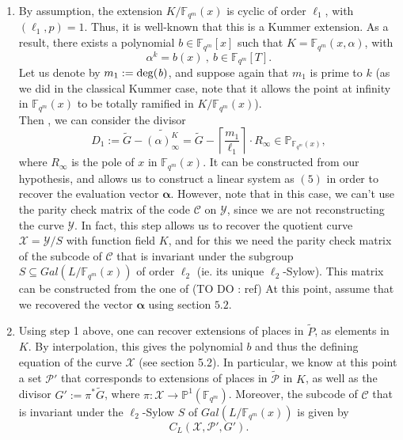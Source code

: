 \documentclass[10pt]{article}
\newcommand{\cd}{\cdot}
\newcommand{\fqm}{\mathbb{F}_{q^m}}
\newcommand{\su}{\subseteq}
\newcommand{\X}{\mathcal{X}}
\newcommand{\Y}{\mathcal{Y}}
\newcommand{\PR}{\mathcal{P}}
\begin{document}
\begin{enumerate}
\item By assumption, the extension $K/\fqm(x)$ is cyclic of order $\ell_1$, with $(\ell_1,p)=1$. Thus, it is well-known that this is a Kummer extension. As a result, there exists a polynomial $b \in \fqm[x]$ such that $K = \fqm(x,\alpha)$, with
\[ \alpha^k = b(x) \ , \ b \in \fqm[T].\] Let us denote by $m_1:=\rm{deg}\it (b)$, and suppose again that $m_1$ is prime to $k$ (as we did in the classical Kummer case, note that it allows the point at infinity in $\fqm(x)$ to be totally ramified in $K/\fqm(x)$). \\ Then , we can consider the divisor
\[D_1 := \tilde{G} - \widetilde{(\alpha)^K_{\infty}} = \tilde{G} - \left\lceil\frac{m_1}{\ell_1}\right\rceil \cd R_{\infty} \in \mathbb{P}_{\fqm(x)},\]
where $R_{\infty}$ is the pole of $x$ in $\fqm(x)$. It can be constructed from our hypothesis, and allows us to construct a linear system as $(5)$ in order to recover the evaluation vector $\boldsymbol{\alpha}$. However, note that in this case, we can't use the parity check matrix of the code $\mathcal{C}$ on $\Y$, since we are not reconstructing the curve $\Y$. In fact, this step allows us to recover the quotient curve $\X = \Y/S$ with function field $K$, and for this we need the parity check matrix of the subcode of $\mathcal{C}$ that is invariant under the subgroup $S \su Gal(L/\fqm(x))$ of order $\ell_2$ (ie. its unique $\ell_2$-Sylow). This matrix can be constructed from the one of \color{red}(TO DO : ref) \color{black}
At this point, assume that we recovered the vector $\boldsymbol{\alpha}$ using section $5.2$.

\item Using step 1 above, one can recover extensions of places in $\tilde{P}$, as elements in $K$. By interpolation, this gives the polynomial $b$ and thus the defining equation of the curve $\X$ (see section 5.2). In particular, we know at this point a set $\PR'$ that corresponds to extensions of places in $\tilde{\PR}$ in $K$, as well as the divisor $G' := \pi^*\tilde{G}$, where $\pi : \X \rightarrow \mathbb{P}^1(\fqm)$. Moreover, the subcode of $\mathcal{C}$ that is invariant under the $\ell_2$-Sylow $S$ of $Gal(L/\fqm(x))$ is given by 
\[C_L(\X,\PR',G').\]


\end{enumerate}
\end{document}
